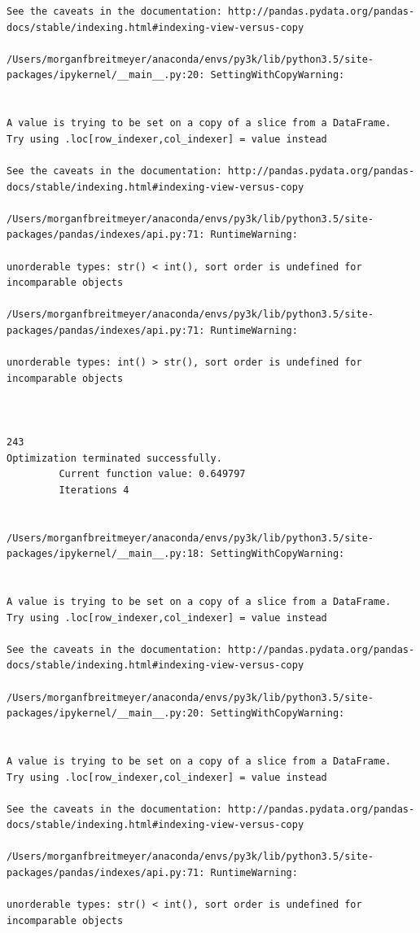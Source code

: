 \begin{lstlisting}
See the caveats in the documentation: http://pandas.pydata.org/pandas-docs/stable/indexing.html#indexing-view-versus-copy

/Users/morganfbreitmeyer/anaconda/envs/py3k/lib/python3.5/site-packages/ipykernel/__main__.py:20: SettingWithCopyWarning:


A value is trying to be set on a copy of a slice from a DataFrame.
Try using .loc[row_indexer,col_indexer] = value instead

See the caveats in the documentation: http://pandas.pydata.org/pandas-docs/stable/indexing.html#indexing-view-versus-copy

/Users/morganfbreitmeyer/anaconda/envs/py3k/lib/python3.5/site-packages/pandas/indexes/api.py:71: RuntimeWarning:

unorderable types: str() < int(), sort order is undefined for incomparable objects

/Users/morganfbreitmeyer/anaconda/envs/py3k/lib/python3.5/site-packages/pandas/indexes/api.py:71: RuntimeWarning:

unorderable types: int() > str(), sort order is undefined for incomparable objects



243
Optimization terminated successfully.
         Current function value: 0.649797
         Iterations 4


/Users/morganfbreitmeyer/anaconda/envs/py3k/lib/python3.5/site-packages/ipykernel/__main__.py:18: SettingWithCopyWarning:


A value is trying to be set on a copy of a slice from a DataFrame.
Try using .loc[row_indexer,col_indexer] = value instead

See the caveats in the documentation: http://pandas.pydata.org/pandas-docs/stable/indexing.html#indexing-view-versus-copy

/Users/morganfbreitmeyer/anaconda/envs/py3k/lib/python3.5/site-packages/ipykernel/__main__.py:20: SettingWithCopyWarning:


A value is trying to be set on a copy of a slice from a DataFrame.
Try using .loc[row_indexer,col_indexer] = value instead

See the caveats in the documentation: http://pandas.pydata.org/pandas-docs/stable/indexing.html#indexing-view-versus-copy

/Users/morganfbreitmeyer/anaconda/envs/py3k/lib/python3.5/site-packages/pandas/indexes/api.py:71: RuntimeWarning:

unorderable types: str() < int(), sort order is undefined for incomparable objects


\end{lstlisting}
